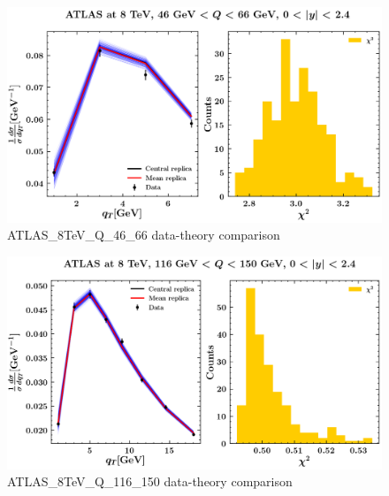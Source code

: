 \documentclass[
]{article}
\begin{document}
\begin{figure}
\centering
\includegraphics{pngplots/ATLAS_8TeV_Q_46_66.png}
\caption{ATLAS\_8TeV\_Q\_46\_66 data-theory comparison}
\end{figure}

\begin{figure}
\centering
\includegraphics{pngplots/ATLAS_8TeV_Q_116_150.png}
\caption{ATLAS\_8TeV\_Q\_116\_150 data-theory comparison}
\end{figure}
\end{document}
